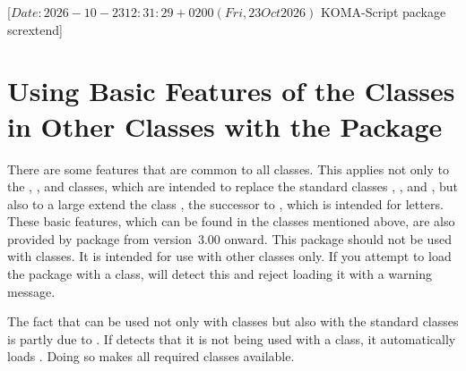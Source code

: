 %
%
%
%
%
%
%

                 [$Date: 2026-10-23 12:31:29 +0200 (Fri, 23 Oct 2026) $
                  KOMA-Script package scrextend]

\chapter[{\KOMAScript{} Features for Other Classes with \Package{scrextend}}]
  {Using Basic Features of the \KOMAScript{} Classes in Other Classes with the
     Package}
\BeginIndexGroup%
%

There are some features that are common to all \KOMAScript{} classes. This
applies not only to the , , and
 classes, which are intended to replace the standard classes
, , and , but also to a large extend
the \KOMAScript{} class , the successor to ,
which is intended for letters. These basic features, which can be found in the
classes mentioned above, are also provided by package  from
\KOMAScript{} version~3.00 onward. This package should
not be used with \KOMAScript{} classes. It is intended for use with other
classes only. If you attempt to load the package with a \KOMAScript{} class,
 will detect this and reject loading it with a warning
message.

The fact that \hyperref[cha:scrlttr2]{}%
 can be used not only with \KOMAScript{} classes but
also with the standard classes is partly due to . If
\hyperref[cha:scrlttr2]{} detects that it is not being used
with a \KOMAScript{} class, it automatically loads . Doing
so makes all required \KOMAScript{} classes available.

